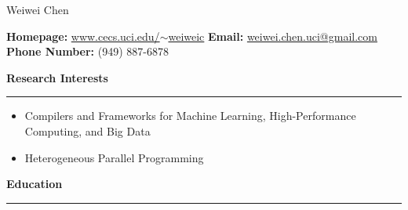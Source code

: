 \documentclass[10pt,A4]{article}
\newcommand{\cvsection}[1]
{
	\begin{flushleft}
  \LARGE\textcolor{sectcol}{\textbf{  #1}}
	\end{flushleft}
  \vspace{-15pt}
  \textcolor{softcol}{\hrule}
  \vspace{8pt}
}
\newcommand{\metasection}[3]
{
\small{#1} \hspace*{\fill} \small{#2}\hspace*{\fill} \small{#3}\\[1pt]
}
\begin{document}
\vspace{-8pt}
\begin{center}
	\HUGE Weiwei Chen
\end{center}

\vspace{6pt}


\metasection{\textbf{Homepage:} \href{http://www.cecs.uci.edu/~weiweic}{www.cecs.uci.edu/$\sim$weiweic}}{\textbf{Email:} \href{mailto:weiwei.chen.uci@gmail.com}{weiwei.chen.uci@gmail.com}}
{\textbf{Phone Number:} (949) 887-6878}
\vspace{-2pt}
\vspace{6pt}

\normalsize

\vspace{-6pt}
\cvsection{Research Interests}

\vspace{-4pt}
\begin{itemize}[leftmargin=*]
 \setlength\itemsep{-0.5cm}
  \item Compilers and Frameworks for Machine Learning, High-Performance Computing, and Big Data \\
  \item Heterogeneous Parallel Programming
\end{itemize}
\vspace{8pt}

%
%

\vspace{-12pt}
\cvsection{Education}
\end{document}
